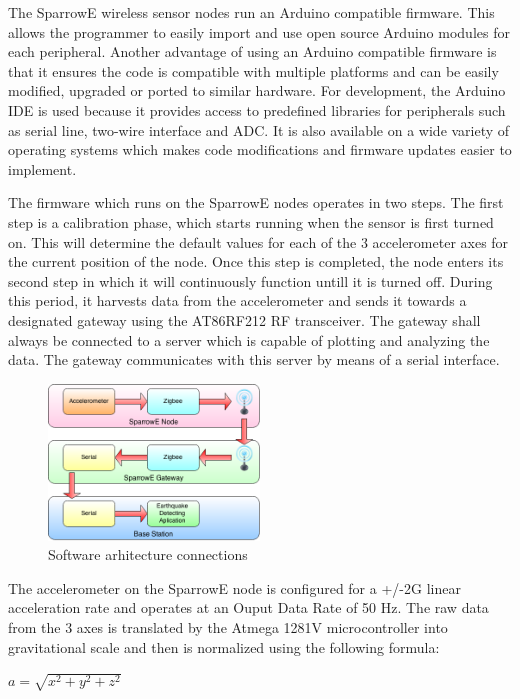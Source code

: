 The SparrowE wireless sensor nodes run an Arduino\cite{arduino} compatible firmware. This allows the programmer to easily import 
and use open source Arduino modules for each peripheral. Another advantage of using an Arduino compatible firmware is that it ensures the code is 
compatible with multiple platforms and can be easily modified, upgraded or ported to similar hardware. For development, the Arduino IDE is used 
because it provides access to predefined libraries for peripherals such as serial line, two-wire interface and ADC. It is also available on a wide 
variety of operating systems which makes code modifications and firmware updates easier to implement.

The firmware which runs on the SparrowE nodes operates in two steps. The first step is a calibration phase, which starts running when the sensor 
is first turned on. This will determine the default values for each of the 3 accelerometer axes for the current position of the node. Once this step 
is completed, the node enters its second step in which it will continuously function untill it is turned off. During this period, it harvests data 
from the accelerometer and sends it towards a designated gateway using the AT86RF212 RF transceiver. The gateway shall always be connected to a server 
which is capable of plotting and analyzing the data. The gateway communicates with this server by means of a serial interface.

\begin{figure}[ht] \centering
  \includegraphics[width=0.5\textwidth]{img/software-architecture.png}
  \caption{Software arhitecture connections}
\end{figure}

The accelerometer on the SparrowE node is configured for a +/-2G linear acceleration rate and operates at an Ouput Data Rate of 50 Hz. 
The raw data from the 3 axes is translated by the Atmega 1281V microcontroller into gravitational scale and then is normalized using the following formula:

$ a = \sqrt{x^2+y^2+z^2}$

